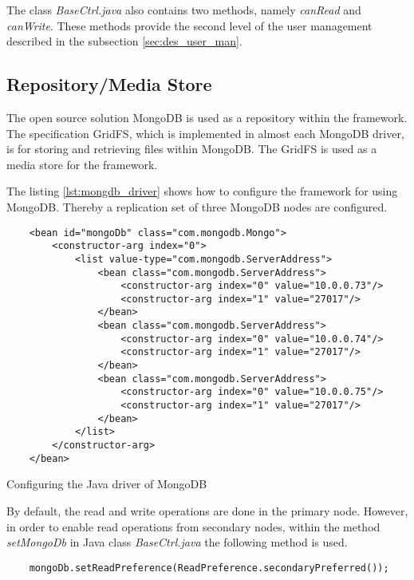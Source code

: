 The class \textit{BaseCtrl.java} also contains two methods, namely \textit{canRead} and \textit{canWrite}. These methods provide the second level of the user management described in the subsection \ref{sec:des_user_man}.

\subsection{Repository/Media Store\label{sec:impl_repo}}

The open source solution MongoDB is used as a repository within the framework. The specification GridFS, which is implemented in almost each MongoDB driver, is for storing and retrieving files within MongoDB. The GridFS is used as a media store for the framework.

The listing \ref{lst:mongdb_driver} shows how to configure the framework for using MongoDB. Thereby a replication set of three MongoDB nodes are configured. 

\begin{code}
\begin{verbatim}
    <bean id="mongoDb" class="com.mongodb.Mongo">
        <constructor-arg index="0">
            <list value-type="com.mongodb.ServerAddress">
                <bean class="com.mongodb.ServerAddress">
                    <constructor-arg index="0" value="10.0.0.73"/>
                    <constructor-arg index="1" value="27017"/>
                </bean>
                <bean class="com.mongodb.ServerAddress">
                    <constructor-arg index="0" value="10.0.0.74"/>
                    <constructor-arg index="1" value="27017"/>
                </bean>
                <bean class="com.mongodb.ServerAddress">
                    <constructor-arg index="0" value="10.0.0.75"/>
                    <constructor-arg index="1" value="27017"/>
                </bean>
            </list>
        </constructor-arg>
    </bean>
\end{verbatim}
\caption{Configuring the Java driver of MongoDB}
\label{lst:mongdb_driver}
\end{code}

By default, the read and write operations are done in the primary node. However, in order to enable read operations from secondary nodes, within the method \textit{setMongoDb} in Java class \textit{BaseCtrl.java} the following method is used.

\begin{code}
\begin{verbatim}
	mongoDb.setReadPreference(ReadPreference.secondaryPreferred());
\end{verbatim}
\end{code}

